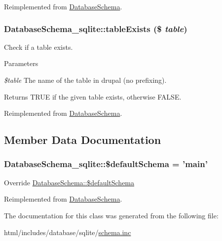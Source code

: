 Reimplemented from \hyperlink{classDatabaseSchema_aaa0b6f32797505bdfc9ed953e10a486e}{DatabaseSchema}.\hypertarget{classDatabaseSchema__sqlite_a8799172b7c34295d232f0335af6ddc08}{
\subsubsection[{tableExists}]{\setlength{\rightskip}{0pt plus 5cm}DatabaseSchema\_\-sqlite::tableExists (\$ {\em table})}}
\label{classDatabaseSchema__sqlite_a8799172b7c34295d232f0335af6ddc08}
Check if a table exists.


\begin{DoxyParams}{Parameters}
\item[{\em \$table}]The name of the table in drupal (no prefixing).\end{DoxyParams}
\begin{DoxyReturn}{Returns}
TRUE if the given table exists, otherwise FALSE. 
\end{DoxyReturn}


Reimplemented from \hyperlink{classDatabaseSchema_acf4650f58bed6fc76d94d49a72e5d706}{DatabaseSchema}.

\subsection{Member Data Documentation}
\hypertarget{classDatabaseSchema__sqlite_ab0f2d6c0731bffc8a88b64cad3a60a3f}{
\subsubsection[{\$defaultSchema}]{\setlength{\rightskip}{0pt plus 5cm}DatabaseSchema\_\-sqlite::\$defaultSchema = 'main'}}
\label{classDatabaseSchema__sqlite_ab0f2d6c0731bffc8a88b64cad3a60a3f}
Override \hyperlink{classDatabaseSchema_ad1b406aa6605327a3f5c910e0fd37816}{DatabaseSchema::\$defaultSchema} 

Reimplemented from \hyperlink{classDatabaseSchema_ad1b406aa6605327a3f5c910e0fd37816}{DatabaseSchema}.

The documentation for this class was generated from the following file:\begin{DoxyCompactItemize}
\item 
html/includes/database/sqlite/\hyperlink{sqlite_2schema_8inc}{schema.inc}\end{DoxyCompactItemize}
